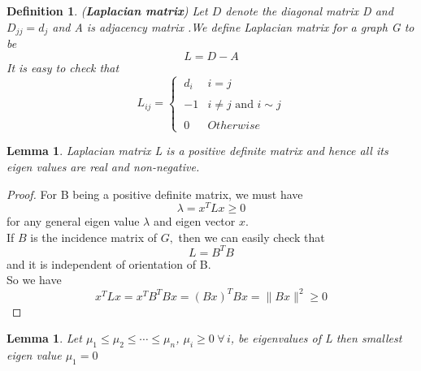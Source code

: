 \documentclass[oneside]{book}
\newtheorem{lemma}[theorem]{Lemma}
\newtheorem{mydef}{Definition}[section]
\begin{document}
\hfill \break




	\begin{mydef}(\textbf{Laplacian matrix})
		Let $D$ denote the diagonal matrix D and  $D_{jj} = d_{j}$  and A is adjacency matrix .We define Laplacian matrix for a graph G to be
		\[
		L = D - A  
		\] 
 	 It is easy to check that
   \begin{equation*}
 L_{ij} = \left\{\ \begin{array}{lll}
  d_i & i = j  \\\\
  -1 &  i\neq j \text{ and } i\sim j    \\\\
      0 & Otherwise 
 \end{array}\right.\end{equation*} 
 
\end{mydef}	

\hfill \break
\begin{lemma}
	Laplacian matrix L is a positive definite matrix and hence all its eigen values are real and non-negative.
\end{lemma}
	\begin{proof}
		
		
		For  B being a positive definite matrix, we must have $$	\lambda = x^{T} L x \geq 0$$
	for any general eigen value $\lambda$ and eigen vector $x$. \\	If $B$ is the  incidence matrix of $G,$ then we can easily check that $$L= B^{T}B $$
		and it is independent of orientation of B. \\
		So we have
		\[
		x^{T} L x= x^{T} B^{T}B   x  = (B x)^{T}B x= \|B x\|^{2} \geq 0
		\]
		
	\end{proof}

	

\begin{lemma}
	Let $\mu_{1} \leq \mu_{2} \leq \cdots \leq \mu_{n}$, $\mu_{i} \geq 0 \hspace{3pt} \forall   \hspace{2pt} i$,  be  eigenvalues of L then smallest eigen value $\mu_{1} = 0$  
\end{lemma}
\end{document}
